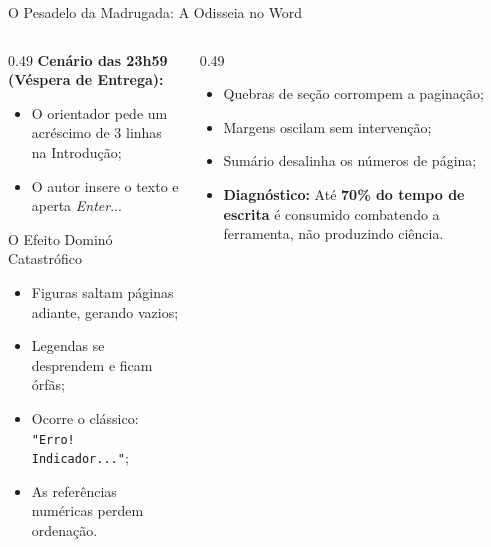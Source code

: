 \documentclass[aspectratio=169, 10pt]{beamer}
\begin{document}
\begin{frame}{O Pesadelo da Madrugada: A Odisseia no Word}
  \begin{columns}[T]
    \begin{column}{0.49\textwidth}
      \textbf{Cenário das 23h59 (Véspera de Entrega):}
      \begin{itemize}\setlength{\itemsep}{1.5pt}
        \item O orientador pede um acréscimo de 3 linhas na Introdução;
        \item O autor insere o texto e aperta \textit{Enter}...
      \end{itemize}
      \vspace{0.10cm}
      \begin{alertblock}{O Efeito Dominó Catastrófico}
        \scriptsize
        \begin{itemize}\setlength{\itemsep}{1.5pt}
          \item Figuras saltam páginas adiante, gerando vazios;
          \item Legendas se desprendem e ficam órfãs;
          \item Ocorre o clássico: \texttt{"Erro! Indicador..."};
          \item As referências numéricas perdem ordenação.
        \end{itemize}
      \end{alertblock}
    \end{column}

    \begin{column}{0.49\textwidth}
      \begin{tcolorbox}[colback=iffblockbg,colframe=iffprimary,arc=1.5mm,title=\textbf{O Custo Operacional Comprovado}]
        \scriptsize
        \begin{itemize}\setlength{\itemsep}{2.5pt}
          \item Quebras de seção corrompem a paginação;
          \item Margens oscilam sem intervenção;
          \item Sumário desalinha os números de página;
          \item \textbf{Diagnóstico:} Até \textbf{70\% do tempo de escrita} é consumido combatendo a ferramenta, não produzindo ciência.
        \end{itemize}
      \end{tcolorbox}
    \end{column}
  \end{columns}
\end{frame}
\end{document}
